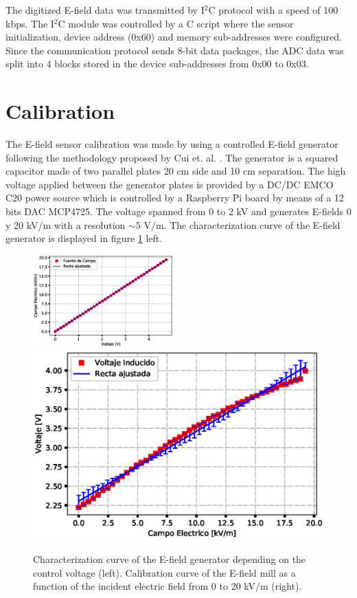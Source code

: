 \documentclass[a4paper]{jpconf}
\begin{document}
The digitized E-field data was transmitted by I$^{2}$C protocol with a speed of 100 kbps. The I$^{2}$C module was controlled by a C script where the sensor initialization, device address (0x60) and memory sub-addresses were configured. Since the communication protocol sends 8-bit data packages, the ADC data was split into 4 blocks stored in the device sub-addresses from 0x00 to 0x03.

\section{Calibration}

The E-field sensor calibration was made by using a controlled E-field generator following the methodology proposed by Cui et. al. \cite{cui2017}. The generator is a squared capacitor made of two parallel plates 20 cm side and 10 cm separation. The high voltage applied between the generator plates is provided by a DC/DC EMCO C20 power source which is controlled by a Raspberry Pi board by means of a 12 bits DAC MCP4725. The voltage spanned from 0 to 2 kV and generates E-fields 0 y 20 kV/m with a resolution $\sim$5 V/m. The characterization curve of the E-field generator is displayed in figure \ref{cal_fuente} left.

\begin{figure}[h]
\begin{center}
\includegraphics[width=0.48\textwidth]{Figures/Fuente_E.eps}
\includegraphics[width=.48\textwidth]{Figures/Emill_Completo.eps}
\caption{\label{cal_fuente} Characterization curve of the E-field generator depending on the control voltage (left). Calibration curve of the E-field mill as a function of the incident electric field from 0 to 20 kV/m (right).}
\label{cal_fuente}
\end{center}
\end{figure}
\end{document}
